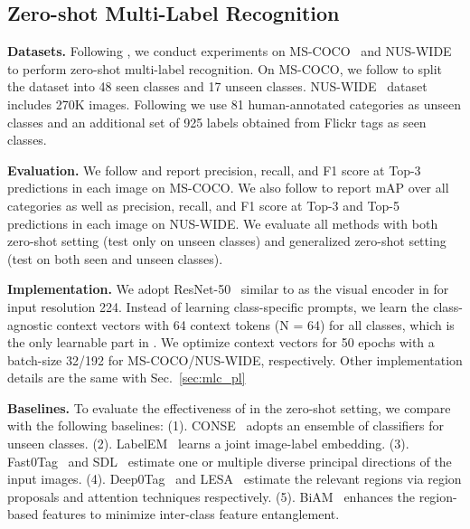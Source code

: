 \subsection{Zero-shot Multi-Label Recognition}
\textbf{Datasets.} 
Following \cite{ben2021semantic, huynh2020shared}, we conduct experiments on MS-COCO~\cite{lin2014microsoft} and NUS-WIDE~\cite{chua2009nus} to perform zero-shot multi-label recognition. On MS-COCO, we follow \cite{bansal2018zero, ben2021semantic} to split the dataset into 48 seen classes and 17 unseen classes. NUS-WIDE~\cite{chua2009nus} dataset includes 270K images. Following \cite{ben2021semantic, huynh2020shared} we use 81 human-annotated categories as unseen classes and an additional set of 925 labels obtained from Flickr tags as seen classes. 

\textbf{Evaluation.}
We follow \cite{ben2021semantic} and report precision, recall, and F1 score at Top-3 predictions in each image on MS-COCO. We also follow \cite{ben2021semantic, huynh2020shared} to report mAP over all categories as well as precision, recall, and F1 score at Top-3 and Top-5 predictions in each image on NUS-WIDE. We evaluate all methods with both zero-shot setting (test only on unseen classes) and generalized zero-shot setting (test on both seen and unseen classes).

\textbf{Implementation.} We adopt ResNet-50~\cite{he2016deep} similar to \cite{ben2021semantic} as the visual encoder in \ours for input resolution 224. Instead of learning class-specific prompts, we learn the class-agnostic context vectors with 64 context tokens (N = 64) for all classes, which is the only learnable part in \ours. We optimize context vectors for 50 epochs with a batch-size 32/192 for MS-COCO/NUS-WIDE, respectively. Other implementation details are the same with Sec.~\ref{sec:mlc_pl}

\textbf{Baselines.}
To evaluate the effectiveness of \ours in the zero-shot setting, we compare with the following baselines: (1). CONSE~\cite{norouzi2013zero} adopts an ensemble of classifiers for unseen classes. (2). LabelEM~\cite{akata2015label} learns a joint image-label embedding. (3). Fast0Tag~\cite{zhang2016fast} and SDL~\cite{ben2021semantic} estimate one or multiple diverse principal directions of the input images. (4). Deep0Tag~\cite{rahman2018deep} and LESA~\cite{huynh2020shared} estimate the relevant regions via region proposals and attention techniques respectively. (5). BiAM~\cite{narayan2021discriminative} enhances the region-based features to minimize inter-class feature entanglement.








